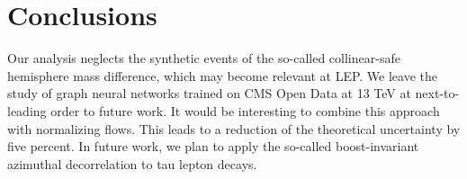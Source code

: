 \section{Conclusions}\label{sec:conclusions}

Our analysis neglects the synthetic events of the so-called
collinear-safe hemisphere mass difference, which may become relevant at
LEP. We leave the study of graph neural networks trained on CMS Open
Data at 13 TeV at next-to-leading order to future work. It would be
interesting to combine this approach with normalizing flows. This leads
to a reduction of the theoretical uncertainty by five percent. In future
work, we plan to apply the so-called boost-invariant azimuthal
decorrelation to tau lepton decays.

